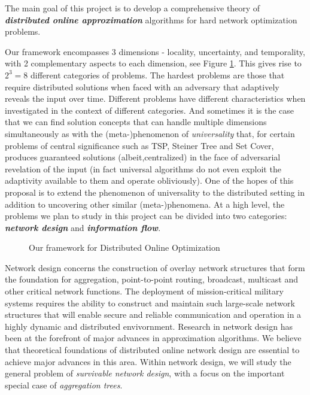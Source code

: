 The main goal of this project is to develop a comprehensive theory of
{\bf \em distributed online approximation}\/ algorithms for hard network
optimization problems.
\iffalse (Repeats what is in the prev para)
This proposal encompasses several challenging
aspects of mission-critical networked systems: (a) there is
considerable uncertainty in the inputs and the network environment
under which the systems operate; (b) the inputs as well as the
underlying network may, in fact, be under adversarial control; (c) the
algorithms running these networked systems need to be
fully-distributed.
\fi
Our framework encompasses 3 dimensions - locality, uncertainty, and temporality, 
with 2 complementary aspects to each dimension, see Figure \ref{fig:dimensions}. 
This gives rise to $2^3 = 8$ different categories of problems. 
The hardest problems are those that require distributed solutions when 
faced with an adversary that adaptively reveals the input over time. Different
problems have different characteristics when investigated in the context of
different categories. And sometimes it is the case that we can find solution
concepts that can handle multiple dimensions simultaneously as with the
(meta-)phenomenon of {\em universality} \cite{} that, for certain problems of central
significance such as TSP, Steiner Tree and Set Cover, produces guaranteed solutions 
(albeit,centralized)
in the face of adversarial revelation of the input (in fact universal algorithms
do not even exploit the adaptivity available to them and operate obliviously).  
One of the hopes of this proposal is to extend the phenomenon of universality to
the distributed setting in addition to uncovering other similar (meta-)phenomena.
At a high level, the problems we plan to study in this project can be
divided into two categories: {\bf \em network design}\/ and {\bf \em
information flow}.

\begin{figure}
\centering
{}
\vspace{-0.5in}
\caption{Our framework for Distributed Online Optimization}
\label{fig:dimensions}
\end{figure}

 Network design concerns the construction of
overlay network structures that form the foundation for aggregation,
point-to-point routing, broadcast, multicast and other critical
network functions.  The deployment of mission-critical military
systems requires the ability to construct and maintain such
large-scale network structures that will enable secure and reliable
communication and operation in a highly dynamic and distributed
envivornment.  Research in network design has been at the forefront of
major advances in approximation algorithms.  We believe that
theoretical foundations of distributed online network design are
essential to achieve major advances in this area.  Within network
design, we will study the general problem of {\em survivable network
  design}, with a focus on the important special case of {\em
  aggregation trees}.

